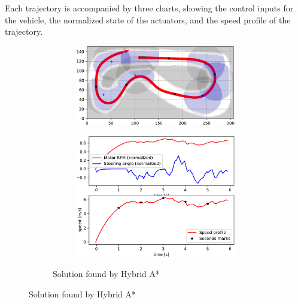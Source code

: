Each trajectory is accompanied by three charts, showing the control inputs for the vehicle, the normalized state of the actuators, and the speed profile of the trajectory.


\begin{figure}[!tbp]%
	\centering

	\begin{subfigure}[t]{\textwidth}
		\begin{subfigure}[t]{0.45\textwidth}
			\includegraphics[width=\textwidth]{../img/experiments/porto-hybrid_astar-trajectory}
		\end{subfigure}
		\hfill
		\begin{subfigure}[t]{0.45\textwidth}
			\includegraphics[width=\textwidth]{../img/experiments/porto-hybrid_astar-actuators}
		\end{subfigure}
		\caption{Solution found by Hybrid A*}
		\label{fig:solution_porto-hybrid_astar}	
	\end{subfigure}
	

\end{figure}
